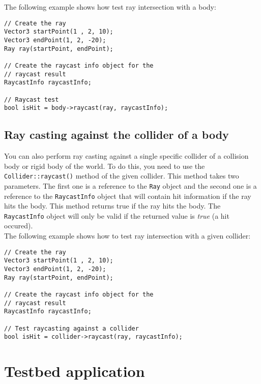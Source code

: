 \documentclass[a4paper,12pt]{article}
\begin{document}
    The following example shows how test ray intersection with a body: \\

    \begin{lstlisting}
// Create the ray
Vector3 startPoint(1 , 2, 10);
Vector3 endPoint(1, 2, -20);
Ray ray(startPoint, endPoint);

// Create the raycast info object for the
// raycast result
RaycastInfo raycastInfo;

// Raycast test
bool isHit = body->raycast(ray, raycastInfo);
    \end{lstlisting}

    \vspace{0.6cm}

    \subsection{Ray casting against the collider of a body}

    You can also perform ray casting against a single specific collider of a collision body or rigid body of the world. To do this, you need to use the
    \texttt{Collider::raycast()} method of the given collider. This method takes two parameters. The first one is a reference to the \texttt{Ray}
    object and the second one is a reference to the \texttt{RaycastInfo} object that will contain hit information if the ray hits the body. This method returns
    true if the ray hits the body. The \texttt{RaycastInfo} object will only be valid if the returned value is \emph{true} (a hit occured). \\

    The following example shows how to test ray intersection with a given collider: \\

    \begin{lstlisting}
// Create the ray
Vector3 startPoint(1 , 2, 10);
Vector3 endPoint(1, 2, -20);
Ray ray(startPoint, endPoint);

// Create the raycast info object for the
// raycast result
RaycastInfo raycastInfo;

// Test raycasting against a collider
bool isHit = collider->raycast(ray, raycastInfo);
    \end{lstlisting}

    \vspace{0.6cm}

    \section{Testbed application}
    \label{sec:testbed}
\end{document}
